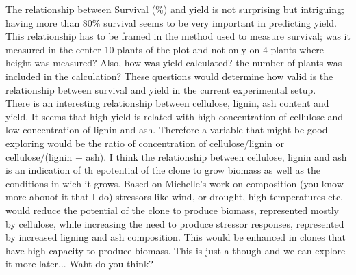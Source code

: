 \documentclass{article}\usepackage[]{graphicx}\usepackage[]{color}
\begin{document}
The relationship between Survival (\%) and yield is not surprising but intriguing; having more than 80\% survival seems to be very important in predicting yield. This relationship has to be framed in the method used to measure survival; was it measured in the center 10 plants of the plot and not only on 4 plants where height was measured?  Also, how was yield calculated? the number of plants was included in the calculation? These questions would determine how valid is the relationship between survival and yield in the current experimental setup.\\

There is an interesting relationship between cellulose, lignin, ash content and yield. It seems that high yield is related with high concentration of cellulose and low concentration of lignin and ash. Therefore a variable that might be good exploring would be the ratio of concentration of cellulose/lignin or cellulose/(lignin + ash). I think the relationship between cellulose, lignin and ash is an indication of th epotential of the clone to grow biomass as well as the conditions in wich it grows. Based on Michelle's work on composition (you know more abouot it that I do) stressors like wind, or drought, high temperatures etc, would reduce the potential of the clone to produce biomass, represented mostly by cellulose, while increasing the need to produce stressor responses, represented by increased ligning and ash composition. This would be enhanced in clones that have high capacity to produce biomass. This is just a though and we can explore it more later... Waht do you think? \\
\end{document}
